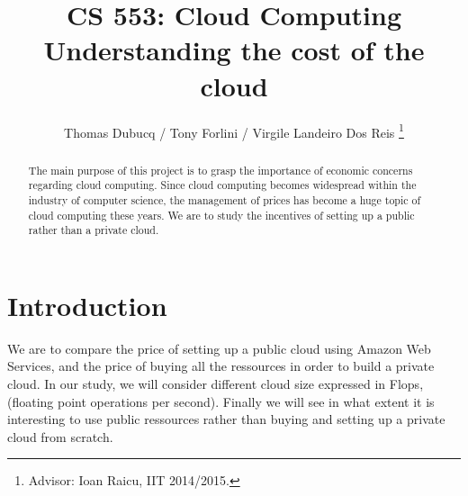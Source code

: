 \documentclass[12pt,journal, a4paper]{IEEEtran}
\begin{document}
    \title{CS 553: Cloud Computing\\Understanding the cost of the cloud}
    \author{Thomas Dubucq / Tony Forlini / Virgile Landeiro Dos Reis
    \thanks{Advisor: Ioan Raicu, IIT 2014/2015.}}
    \maketitle

\begin{abstract}
The main purpose of this project is to grasp the importance of economic concerns regarding cloud computing. Since cloud computing becomes widespread within the industry of computer science, the management of prices has become a huge topic of cloud computing these years. We are to study the incentives of setting up a public rather than a private cloud. 
\end{abstract}

\section{Introduction}
We are to compare the price of setting up a public cloud using Amazon Web Services, and the price of buying all the ressources in order to build a private cloud. In our study, we will consider different cloud size expressed in Flops, (floating point operations per second). Finally we will see in what extent it is interesting to use public ressources rather than buying and setting up a private cloud from scratch. 
\end{document}
